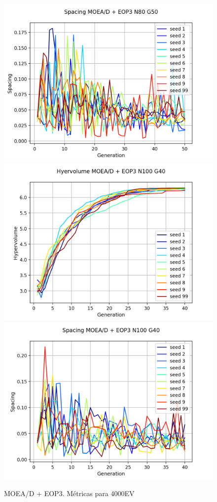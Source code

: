 \begin{figure}[H]
\includegraphics[scale=0.43]{figures/METRICS_EOP3/Spacing_N80_G50.png}\\
\includegraphics[scale=0.43]{figures/METRICS_EOP3/Hypervol_N100_G40.png}\quad 
\includegraphics[scale=0.43]{figures/METRICS_EOP3/Spacing_N100_G40.png}\\
\caption{MOEA/D + EOP3. Métricas para 4000EV}
\label{fig:24}
\end{figure}


